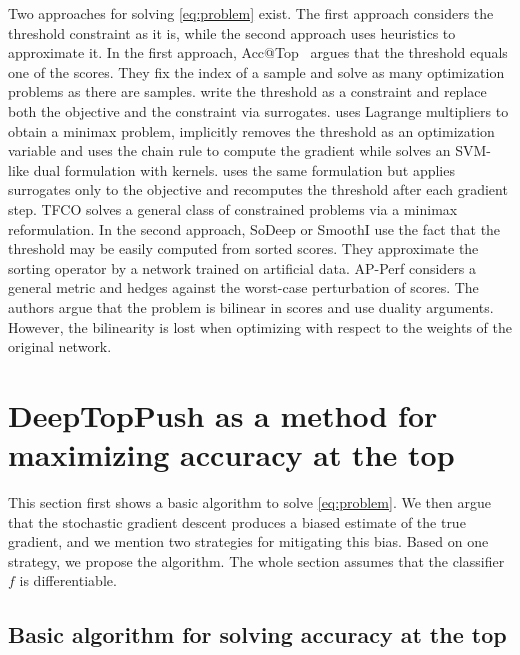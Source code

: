 Two approaches for solving \eqref{eq:problem} exist. The first approach considers the threshold constraint as it is, while the second approach uses heuristics to approximate it. In the first approach, Acc@Top~\cite{boyd2012accuracy} argues that the threshold equals one of the scores. They fix the index of a sample and solve as many optimization problems as there are samples. \cite{eban2017scalable,adam2019patmat,kumar2021implicit} write the threshold as a constraint and replace both the objective and the constraint via surrogates. \cite{eban2017scalable} uses Lagrange multipliers to obtain a minimax problem, \cite{mackey2018constrained} implicitly removes the threshold as an optimization variable and uses the chain rule to compute the gradient while \cite{macha2020nonlinear} solves an SVM-like dual formulation with kernels. \cite{grill2016learning} uses the same formulation but applies surrogates only to the objective and recomputes the threshold after each gradient step. TFCO \cite{cotter2019optimization} solves a general class of constrained problems via a minimax reformulation. In the second approach, SoDeep \cite{engilberge2019sodeep} or SmoothI \cite{thonet2021smoothi} use the fact that the threshold may be easily computed from sorted scores. They approximate the sorting operator by a network trained on artificial data. AP-Perf \cite{fathony2019ap} considers a general metric and hedges against the worst-case perturbation of scores. The authors argue that the problem is bilinear in scores and use duality arguments. However, the bilinearity is lost when optimizing with respect to the weights of the original network. 

\section{DeepTopPush as a method for maximizing accuracy at the top}\label{sec:solving}

This section first shows a basic algorithm to solve \eqref{eq:problem}. We then argue that the stochastic gradient descent produces a biased estimate of the true gradient, and we mention two strategies for mitigating this bias. Based on one strategy, we propose the \DeepTopPush algorithm. The whole section assumes that the classifier $f$ is differentiable.

\subsection{Basic algorithm for solving accuracy at the top}

